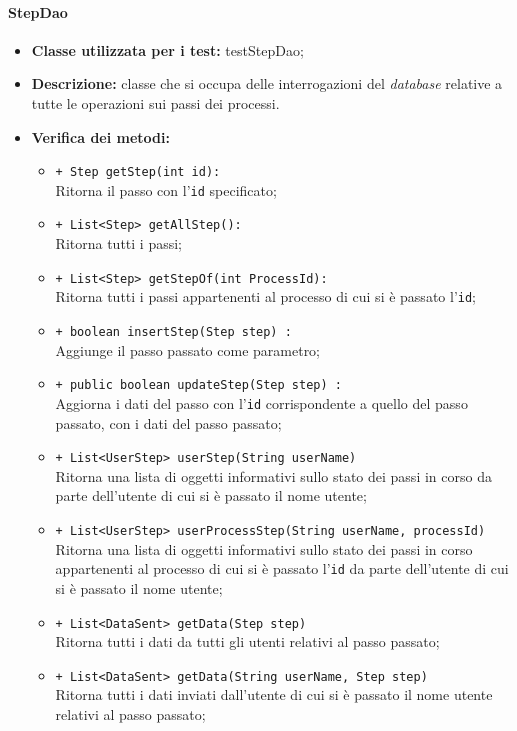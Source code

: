 \paragraph{StepDao}
\begin{flushleft}
\begin{itemize}
\item \textbf{Classe utilizzata per i test:} testStepDao;
\item \textbf{Descrizione:} classe che si occupa delle interrogazioni del \textit{database} relative a tutte le operazioni sui passi dei processi.
\item \textbf{Verifica dei metodi:}
\begin{sloppypar}
\begin{itemize}
\item \texttt{+ Step getStep(int id):}\\ Ritorna il passo con l'\texttt{id} specificato; 
\item \texttt{+ List<Step> getAllStep():}\\ Ritorna tutti i passi;
\item \texttt{+ List<Step> getStepOf(int ProcessId):}\\ Ritorna tutti i passi appartenenti al processo di cui si è passato l'\texttt{id};
\item \texttt{+ boolean insertStep(Step step) :}\\ Aggiunge il passo passato come parametro;
\item \texttt{+ public boolean updateStep(Step step) :}\\ Aggiorna i dati del passo con l'\texttt{id} corrispondente a quello del passo passato, con i dati del passo passato;
\item \texttt{+ List<UserStep> userStep(String userName)}\\ Ritorna una lista di oggetti informativi sullo stato dei passi in corso da parte dell'utente di cui si è passato il nome utente;
\item \texttt{+ List<UserStep> userProcessStep(String userName, processId)}\\ Ritorna una lista di oggetti informativi sullo stato dei passi in corso appartenenti al processo di cui si è passato l'\texttt{id} da parte dell'utente di cui si è passato il nome utente;
\item \texttt{+ List<DataSent> getData(Step step)}\\ Ritorna tutti i dati da tutti gli utenti relativi al passo passato;
\item \texttt{+ List<DataSent> getData(String userName, Step step)}\\ Ritorna tutti i dati inviati dall'utente di cui si è passato il nome utente relativi al passo passato;

\end{itemize}
\end{sloppypar}
\end{itemize}
\end{flushleft}
